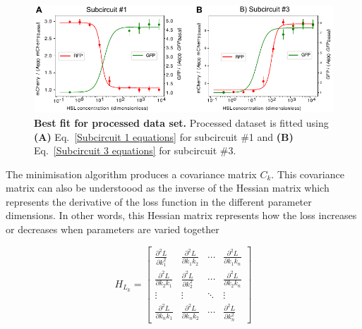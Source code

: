 \begin{figure}[H] %
    \centering
    \begin{adjustbox}{center}
        \includegraphics[width=1\textwidth]{chapters/Chapter 2/dose_responses_bestfit} %
    \end{adjustbox}
    \caption{\textbf{Best fit for processed data set.} Processed dataset is fitted using \textbf{(A)} Eq.~\ref{Subcircuit 1 equations} for subcircuit \#1 and \textbf{(B)} Eq.~\ref{Subcircuit 3 equations} for subcircuit \#3.}

    \label{fig:dose_responses_bestfit} %
\end{figure}


The minimisation algorithm produces a covariance matrix $C_k$. This covariance matrix can also be understoood as the inverse of the Hessian matrix which represents the derivative of the loss function in the different parameter dimensions.
In other words, this Hessian matrix represents how the loss increases or decreases when parameters are varied together

\begin{equation}
    H_{L_{k}} = \begin{bmatrix}
                     \frac{\partial^2 L}{\partial k_1^2} & \frac{\partial^2 L}{\partial k_1 k_2} & \cdots & \frac{\partial^2 L}{\partial k_1 k_{n}} \\
                     \frac{\partial^2 L}{\partial k_2 k_1} & \frac{\partial^2 L}{\partial k_2^2} & \cdots & \frac{\partial^2 L}{\partial k_2  k_{n}} \\
                     \vdots & \vdots & \ddots & \vdots \\
                     \frac{\partial^2 L}{\partial k_{n}k_1} & \frac{\partial^2 L}{\partial k_{n}  k_2} & \cdots & \frac{\partial^2 L}{\partial k_{n}^2}
    \end{bmatrix}
\end{equation}


